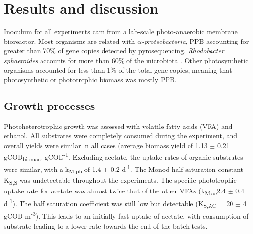 \newpage
\section{Results and discussion}
Inoculum for all experiments cam from a lab-scale photo-anaerobic membrane bioreactor. Most organisms are related with $\alpha$\textit{-proteobacteria}, PPB accounting for greater than 70\% of gene copies detected by pyrosequencing. \textit{Rhodobacter sphaeroides} accounts for more than 60\% of the microbiota \cite{Hulsen2016}. Other photosynthetic organisms accounted for less than 1\% of the total gene copies, meaning that photosynthetic or phototrophic biomass was mostly PPB. 














\subsection{Growth processes}
Photoheterotrophic growth was assessed with volatile fatty acids (VFA) and ethanol. All substrates were completely consumed during the experiment, and overall yields were similar in all cases (average biomass yield of 1.13 $\pm$ 0.21 gCOD\textsubscript{biomass} gCOD\textsuperscript{-1}. Excluding acetate, the uptake rates of organic substrates were similar, with a k\textsubscript{M,ph} of 1.4 $\pm$ 0.2 d\textsuperscript{-1}. The Monod half saturation constant K\textsubscript{S,S} was undetectable throughout the experiments. The specific phototrophic uptake rate for acetate was almost twice that of the other VFAs (k\textsubscript{M,ac}2.4 $\pm$ 0.4 d\textsuperscript{-1}). The half saturation coefficient was still low but detectable (K\textsubscript{S,AC} = 20 $\pm$ 4 gCOD m\textsuperscript{-3}). This leads to an initially fast uptake of acetate, with consumption of substrate leading to a lower rate towards the end of the batch tests. 

